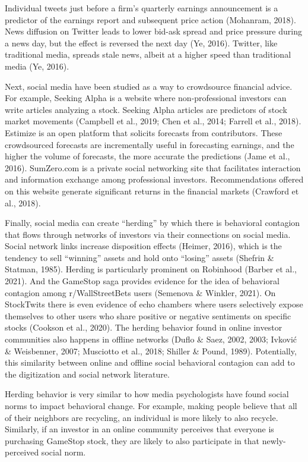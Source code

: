 \documentclass[12pt,]{article}
\begin{document}
Individual tweets just before a firm's quarterly earnings announcement
is a predictor of the earnings report and subsequent price action
(Mohanram, 2018). News diffusion on Twitter leads to lower bid-ask
spread and price pressure during a news day, but the effect is reversed
the next day (Ye, 2016). Twitter, like traditional media, spreads stale
news, albeit at a higher speed than traditional media (Ye, 2016).

Next, social media have been studied as a way to crowdsource financial
advice. For example, Seeking Alpha is a website where non-professional
investors can write articles analyzing a stock. Seeking Alpha articles
are predictors of stock market movements (Campbell et al., 2019; Chen et
al., 2014; Farrell et al., 2018). Estimize is an open platform that
solicits forecasts from contributors. These crowdsourced forecasts are
incrementally useful in forecasting earnings, and the higher the volume
of forecasts, the more accurate the predictions (Jame et al., 2016).
SumZero.com is a private social networking site that facilitates
interaction and information exchange among professional investors.
Recommendations offered on this website generate significant returns in
the financial markets (Crawford et al., 2018).

Finally, social media can create ``herding'' by which there is
behavioral contagion that flows through networks of investors via their
connections on social media. Social network links increase disposition
effects (Heimer, 2016), which is the tendency to sell ``winning'' assets
and hold onto ``losing'' assets (Shefrin \& Statman, 1985). Herding is
particularly prominent on Robinhood (Barber et al., 2021). And the
GameStop saga provides evidence for the idea of behavioral contagion
among r/WallStreetBets users (Semenova \& Winkler, 2021). On StockTwits
there is even evidence of echo chambers where users selectively expose
themselves to other users who share positive or negative sentiments on
specific stocks (Cookson et al., 2020). The herding behavior found in
online investor communities also happens in offline networks (Duflo \&
Saez, 2002, 2003; Ivković \& Weisbenner, 2007; Musciotto et al., 2018;
Shiller \& Pound, 1989). Potentially, this similarity between online and
offline social behavioral contagion can add to the digitization and
social network literature.

Herding behavior is very similar to how media psychologists have found
social norms to impact behavioral change. For example, making people
believe that all of their neighbors are recycling, an individual is more
likely to also recycle. Similarly, if an investor in an online community
perceives that everyone is purchasing GameStop stock, they are likely to
also participate in that newly-perceived social norm.
\end{document}
